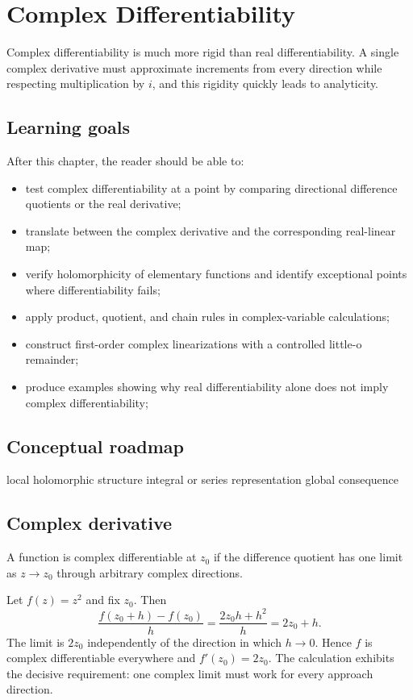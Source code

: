 \chapter{Complex Differentiability}
\label{ch:iv01}

Complex differentiability is much more rigid than real differentiability. A single complex derivative must approximate increments from every direction while respecting multiplication by $i$, and this rigidity quickly leads to analyticity.

\section*{Learning goals}
After this chapter, the reader should be able to:
\begin{itemize}
\item test complex differentiability at a point by comparing directional difference quotients or the real derivative;
\item translate between the complex derivative and the corresponding real-linear map;
\item verify holomorphicity of elementary functions and identify exceptional points where differentiability fails;
\item apply product, quotient, and chain rules in complex-variable calculations;
\item construct first-order complex linearizations with a controlled little-o remainder;
\item produce examples showing why real differentiability alone does not imply complex differentiability;
\end{itemize}
\section*{Conceptual roadmap}
\volroadmap
  {local holomorphic structure}
  {integral or series representation}
  {global consequence}

\section{Complex derivative}
A function is complex differentiable at $z_0$ if the difference quotient has one limit as $z\to z_0$ through arbitrary complex directions.

\begin{example}\label{ex:iv01-expand-01}
Let \(f(z)=z^2\) and fix \(z_0\). Then
\[
\frac{f(z_0+h)-f(z_0)}{h}
=\frac{2z_0h+h^2}{h}=2z_0+h.
\]
The limit is \(2z_0\) independently of the direction in which \(h\to0\). Hence \(f\) is complex differentiable everywhere and \(f'(z_0)=2z_0\). The calculation exhibits the decisive requirement: one complex limit must work for every approach direction.
\end{example}
